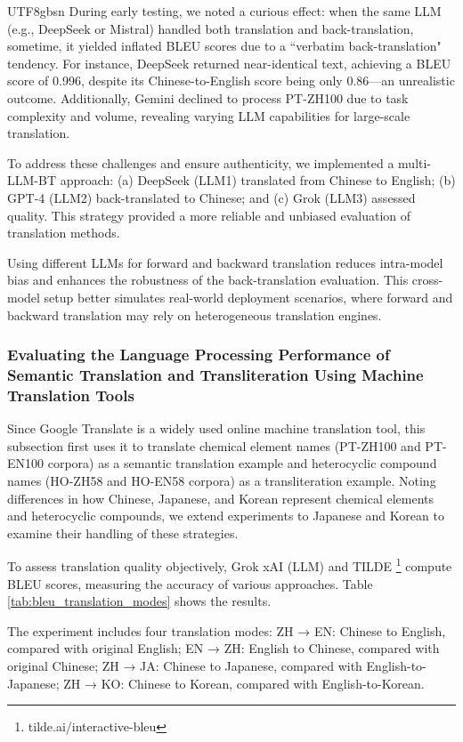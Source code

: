 \documentclass[conference]{IEEEtran}
\begin{document}
\begin{CJK*}{UTF8}{gbsn}
During early testing, we noted a curious effect: when the same LLM (e.g., DeepSeek or Mistral) handled both translation and back-translation, sometime, it  yielded inflated BLEU scores due to a “verbatim back-translation" tendency. For instance, DeepSeek returned near-identical text, achieving a BLEU score of 0.996, despite its Chinese-to-English score being only 0.86—an unrealistic outcome. Additionally, Gemini declined to process PT-ZH100 due to task complexity and volume, revealing varying LLM capabilities for large-scale translation.

To address these challenges and ensure authenticity, we implemented a multi-LLM-BT approach: (a) DeepSeek (LLM1) translated from Chinese to English; (b) GPT-4 (LLM2) back-translated to Chinese; and (c) Grok (LLM3) assessed quality. This strategy provided a more reliable and unbiased evaluation of translation methods.

Using different LLMs for forward and backward translation reduces intra-model bias and enhances the robustness of the back-translation evaluation. This cross-model setup better simulates real-world deployment scenarios, where forward and backward translation may rely on heterogeneous translation engines.

\subsubsection{Evaluating the Language Processing Performance of Semantic Translation and Transliteration Using Machine Translation Tools}
Since Google Translate is a widely used online machine translation tool, this subsection first uses it to translate chemical element names (PT-ZH100 and PT-EN100 corpora) as a semantic translation example and heterocyclic compound names (HO-ZH58 and HO-EN58 corpora) as a transliteration example. Noting differences in how Chinese, Japanese, and Korean represent chemical elements and heterocyclic compounds, we extend experiments to Japanese and Korean to examine their handling of these strategies.

To assess translation quality objectively, Grok xAI (LLM) and TILDE \footnote{tilde.ai/interactive-bleu} compute BLEU scores, measuring the accuracy of various approaches. Table \ref{tab:bleu_translation_modes} shows the results.

The experiment includes four translation modes: ZH → EN: Chinese to English, compared with original English; EN → ZH: English to Chinese, compared with original Chinese; ZH → JA: Chinese to Japanese, compared with English-to-Japanese; ZH → KO: Chinese to Korean, compared with English-to-Korean.



\end{CJK*}
\end{document}
